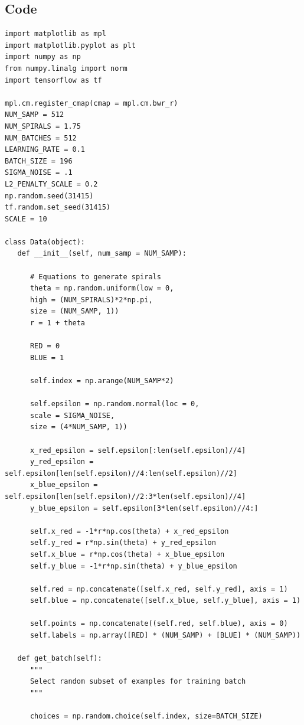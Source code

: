 \documentclass[12pt]{article}
\begin{document}
\clearpage
\begin{adjustwidth}{-50pt}{0pt}

\section{Code}

\begin{Verbatim}
import matplotlib as mpl
import matplotlib.pyplot as plt
import numpy as np
from numpy.linalg import norm
import tensorflow as tf

mpl.cm.register_cmap(cmap = mpl.cm.bwr_r)
NUM_SAMP = 512
NUM_SPIRALS = 1.75
NUM_BATCHES = 512
LEARNING_RATE = 0.1
BATCH_SIZE = 196
SIGMA_NOISE = .1
L2_PENALTY_SCALE = 0.2
np.random.seed(31415)
tf.random.set_seed(31415)
SCALE = 10

class Data(object):
   def __init__(self, num_samp = NUM_SAMP):
      
      # Equations to generate spirals
      theta = np.random.uniform(low = 0,
      high = (NUM_SPIRALS)*2*np.pi,
      size = (NUM_SAMP, 1))
      r = 1 + theta
      
      RED = 0
      BLUE = 1
      
      self.index = np.arange(NUM_SAMP*2)
      
      self.epsilon = np.random.normal(loc = 0,
      scale = SIGMA_NOISE,
      size = (4*NUM_SAMP, 1))
      
      x_red_epsilon = self.epsilon[:len(self.epsilon)//4]
      y_red_epsilon = self.epsilon[len(self.epsilon)//4:len(self.epsilon)//2]
      x_blue_epsilon = self.epsilon[len(self.epsilon)//2:3*len(self.epsilon)//4]
      y_blue_epsilon = self.epsilon[3*len(self.epsilon)//4:]
      
      self.x_red = -1*r*np.cos(theta) + x_red_epsilon
      self.y_red = r*np.sin(theta) + y_red_epsilon
      self.x_blue = r*np.cos(theta) + x_blue_epsilon
      self.y_blue = -1*r*np.sin(theta) + y_blue_epsilon
      
      self.red = np.concatenate([self.x_red, self.y_red], axis = 1)
      self.blue = np.concatenate([self.x_blue, self.y_blue], axis = 1)
      
      self.points = np.concatenate((self.red, self.blue), axis = 0)
      self.labels = np.array([RED] * (NUM_SAMP) + [BLUE] * (NUM_SAMP))

   def get_batch(self):
      """
      Select random subset of examples for training batch
      """
      
      choices = np.random.choice(self.index, size=BATCH_SIZE)
      

\end{Verbatim}
\end{adjustwidth}
\end{document}
